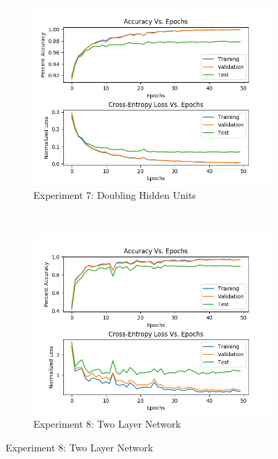 \documentclass{article} %
\begin{document}
{{\begin{figure}[h!]
\captionsetup[subfigure]{labelformat=empty}
    \centering
    \begin{subfigure}[t]{0.5\textwidth}
        \centering
        \includegraphics[scale=0.48]{5A_2.png}
        \caption{Experiment 7: Doubling Hidden Units}
    \end{subfigure}%
    ~ 
    \begin{subfigure}[t]{0.5\textwidth}
        \centering
        \includegraphics[scale=0.48]{5B.png}
        \caption{Experiment 8: Two Layer Network}
    \end{subfigure}
\end{figure}




}}
\end{document}
